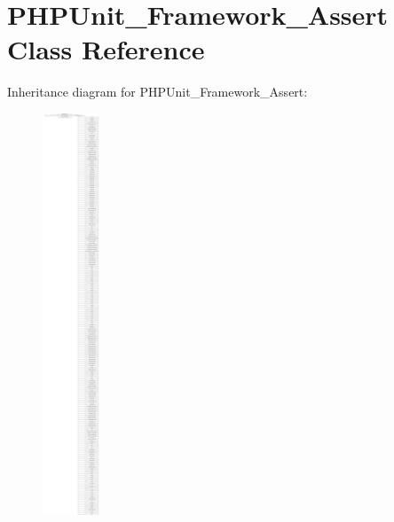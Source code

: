 \hypertarget{class_p_h_p_unit___framework___assert}{}\section{P\+H\+P\+Unit\+\_\+\+Framework\+\_\+\+Assert Class Reference}
\label{class_p_h_p_unit___framework___assert}
Inheritance diagram for P\+H\+P\+Unit\+\_\+\+Framework\+\_\+\+Assert\+:\begin{figure}[H]
\begin{center}
\leavevmode
\includegraphics[height=12.000000cm]{class_p_h_p_unit___framework___assert}
\end{center}
\end{figure}
